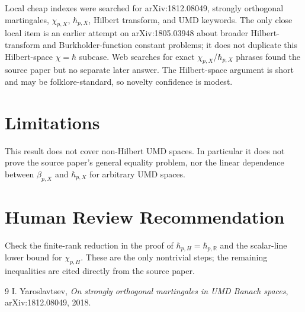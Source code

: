 \documentclass[11pt]{article}
\begin{document}
Local cheap indexes were searched for arXiv:1812.08049, strongly orthogonal
martingales, \(\chi_{p,X}\), \(\hbar_{p,X}\), Hilbert transform, and UMD
keywords.  The only close local item is an earlier attempt on arXiv:1805.03948
about broader Hilbert-transform and Burkholder-function constant problems; it
does not duplicate this Hilbert-space \(\chi=\hbar\) subcase.  Web searches for
exact \(\chi_{p,X}\)/\(\hbar_{p,X}\) phrases found the source paper but no
separate later answer.  The Hilbert-space argument is short and may be
folklore-standard, so novelty confidence is modest.

\section*{Limitations}

This result does not cover non-Hilbert UMD spaces.  In particular it does not
prove the source paper's general equality problem, nor the linear dependence
between \(\beta_{p,X}\) and \(\hbar_{p,X}\) for arbitrary UMD spaces.

\section*{Human Review Recommendation}

Check the finite-rank reduction in the proof of \(\hbar_{p,H}= \hbar_{p,\mathbb
R}\) and the scalar-line lower bound for \(\chi_{p,H}\).  These are the only
nontrivial steps; the remaining inequalities are cited directly from the
source paper.

\begin{thebibliography}{9}
I. Yaroslavtsev,
\emph{On strongly orthogonal martingales in UMD Banach spaces},
arXiv:1812.08049, 2018.
\end{thebibliography}
\end{document}

